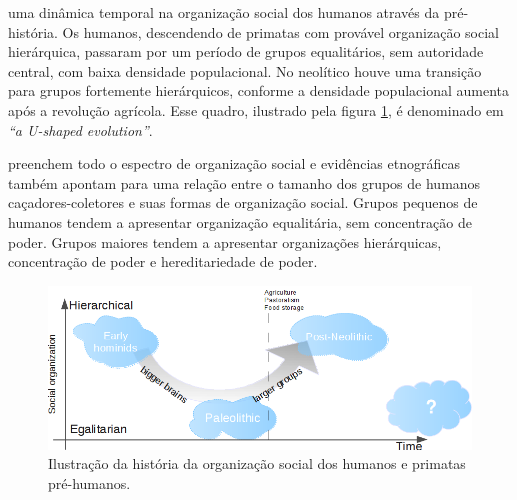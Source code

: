  uma dinâmica temporal na organização social dos humanos através da pré-história\cite[-3cm]{Knauft1991, Marcus2008}. Os humanos, descendendo de primatas com provável organização social hierárquica, passaram por um período de grupos equalitários, sem autoridade central, com baixa densidade populacional. No neolítico houve uma transição para grupos fortemente hierárquicos, conforme a densidade populacional aumenta após a revolução agrícola. Esse quadro, ilustrado pela figura \ref{fig:ushaped}, é denominado em \citep{Knauft1991} \emph{``a U-shaped evolution''}. 

 preenchem todo o espectro de organização social \cite[-3.5cm]{Vehrencamp1983} e evidências etnográficas também apontam para uma relação entre o tamanho dos grupos de humanos caçadores-coletores e suas formas de organização social\cite[-1cm]{Currie2010}. Grupos pequenos de humanos tendem a apresentar organização equalitária, sem concentração de poder. Grupos maiores tendem a apresentar organizações hierárquicas, concentração de poder e hereditariedade de poder. 
\begin{figure}
	\centering
	\includegraphics[width = 1.05\textwidth]{figuras/ushaped.png}
	\caption{ Ilustração da história da organização social dos humanos e primatas pré-humanos.}
	\label{fig:ushaped}
\end{figure}

